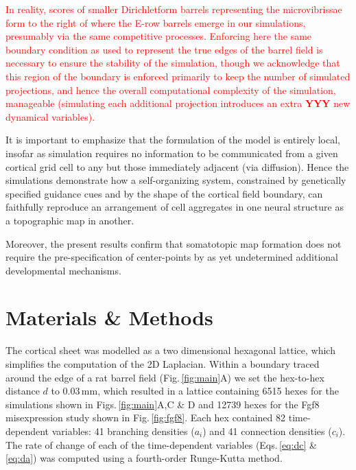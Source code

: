 \documentclass[9pt,lineno]{elife}
\newcommand{\stu}[1]{\textcolor{red}{#1}}
\begin{document}
\stu{In reality, scores of smaller Dirichletform barrels representing the
  microvibrissae form to the right of where the E-row barrels emerge in our
  simulations, presumably via the same competitive processes. Enforcing here
  the same boundary condition as used to represent the true edges of the
  barrel field is necessary to ensure the stability of the simulation, though
  we acknowledge that this region of the boundary is enforced primarily to
  keep the number of simulated projections, and hence the overall
  computational complexity of the simulation, manageable (simulating each
  additional projection introduces an extra \textbf{YYY} new dynamical
  variables).}

It is important to emphasize that the formulation of the model is entirely
local, insofar as simulation requires no information to be communicated from a
given cortical grid cell to any but those immediately adjacent (via
diffusion). Hence the simulations demonstrate how a self-organizing system,
constrained by genetically specified guidance cues and by the shape of the
cortical field boundary, can faithfully reproduce an arrangement of cell
aggregates in one neural structure as a topographic map in another.

Moreover, the present results confirm that somatotopic map formation does not
require the pre-specification of center-points by as yet undetermined
additional developmental mechanisms.

\section{Materials \& Methods}

%
%

The cortical sheet was modelled as a two dimensional hexagonal lattice, which
simplifies the computation of the 2D Laplacian. Within a boundary traced
around the edge of a
rat barrel field (Fig.\,\ref{fig:main}A) we set the hex-to-hex distance
$d$ to 0.03\,mm, which resulted in a lattice containing 6515 hexes for the
simulations shown in Figs.\,\ref{fig:main}A,C \& D and 12739 hexes for the Fgf8
misexpression study shown in Fig.\,\ref{fig:fgf8}. Each hex contained 82 time-dependent
variables: 41 branching densities ($a_i$) and 41 connection densities ($c_i$).
The rate of change of each of the time-dependent variables (Eqs.\,\ref{eq:dc}
\& \ref{eq:da}) was computed using a fourth-order Runge-Kutta method.
\end{document}

